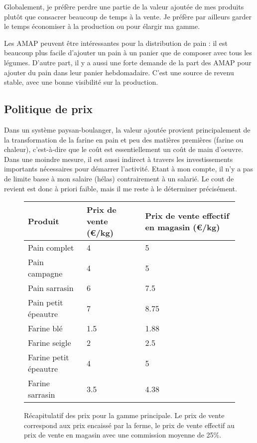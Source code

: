 \documentclass{book}
\begin{document}
Globalement, je préfère perdre une partie de la valeur ajoutée de mes produits plutôt que consacrer beaucoup de temps à la vente. Je préfère par ailleurs garder le temps économiser à la production ou pour élargir ma gamme. 

Les AMAP peuvent être intéressantes pour la distribution de pain : il est beaucoup plus facile d’ajouter un pain à un panier que de composer avec tous les légumes. D’autre part, il y a aussi une forte demande de la part des AMAP pour ajouter du pain dans leur panier hebdomadaire. C’est une source de revenu stable, avec une bonne visibilité sur la production. 

\subsection{Politique de prix}
\label{part:prix}

Dans un système paysan-boulanger, la valeur ajoutée provient principalement de la transformation de la farine en pain et peu des matières premières (farine ou chaleur), c’est-à-dire que le coût est essentiellement un coût de main d’oeuvre. Dans une moindre mesure, il est aussi indirect à travers les investissements importants nécessaires pour démarrer l’activité. Etant à mon compte, il n’y a pas de limite basse à mon salaire (hélas) contrairement à un salarié. Le cout de revient est donc à priori faible, mais il me reste à le déterminer précisément. 

\begin{figure}[h!]
\center
\footnotesize
\begin{tabular}{ | p{3cm} | p{3cm}| p{3cm}|}
\hline
	 Produit & Prix de vente (\euro{}/kg) & Prix de vente effectif en magasin (\euro{}/kg) \\ \hline
	 \hline
	Pain complet & 4 & 5 \\ \hline
	Pain campagne & 4 & 5 \\ \hline
	Pain sarrasin & 6 & 7.5 \\ \hline
	Pain petit épeautre & 7 & 8.75 \\ \hline
	\hline
	Farine blé & 1.5 & 1.88 \\ \hline
	Farine seigle & 2 & 2.5 \\ \hline
	Farine petit épeautre & 4 & 5 \\ \hline
	Farine sarrasin & 3.5 & 4.38 \\ \hline
\end{tabular}
\caption{Récapitulatif des prix pour la gamme principale. Le prix de vente correspond aux prix encaissé par la ferme, le prix de vente effectif au prix de vente en magasin avec une commission moyenne de 25\%.}
\label{tab:prix}
\end{figure}
\end{document}
